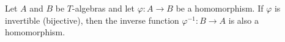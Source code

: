 Let $A$ and $B$ be $T$-algebras and let $\varphi: A \rightarrow B$ be a homomorphism. If $\varphi$ is invertible (bijective), then the inverse function $\varphi^{-1}: B \rightarrow A$ is also a homomorphism.
